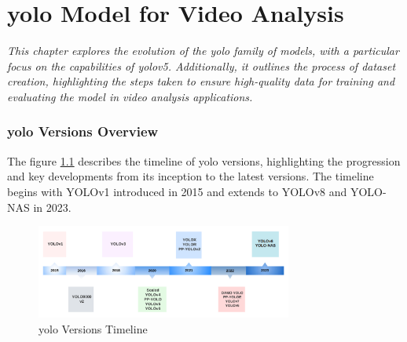 \chapter{\ac{yolo} Model for Video Analysis}
\label{chapter:yolo}

\newenvironment{yolo}
{\quote\itshape}
{\endquote}

\begin{yolo}
    This chapter explores the evolution of the \ac{yolo} family of models, with a particular focus on the capabilities
    of \ac{yolo}v5. Additionally, it outlines the process of dataset creation, highlighting the steps taken to 
    ensure high-quality data for training and evaluating the model 
    in video analysis applications.
\end{yolo}

\subsection{\ac{yolo} Versions Overview}
The figure \ref{fig:yolo-versions} describes the timeline of \ac{yolo} versions, highlighting the 
progression and key developments from its inception to the latest versions. The timeline begins with YOLOv1 
introduced in 2015 and extends to YOLOv8 and YOLO-NAS in 2023.

\begin{figure}[h]
    \centering 
    \includegraphics[width=0.75\textwidth]{figs/yolo-versions.png} 
    \caption{\ac{yolo} Versions Timeline \cite{rfc50}}
    \label{fig:yolo-versions}
\end{figure}

